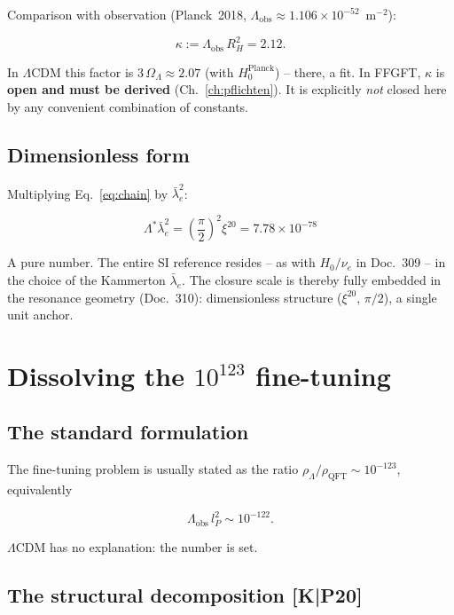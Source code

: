 Comparison with observation (Planck~2018,
$\Lambda_\text{obs} \approx 1.106\times10^{-52}$~m$^{-2}$):

\begin{equation}
  \kappa := \Lambda_\text{obs}\,R_H^{2} = 2.12.
  \label{eq:kappa}
\end{equation}

In $\Lambda$CDM this factor is $3\,\Omega_\Lambda \approx 2.07$
(with $H_0^\text{Planck}$) -- there, a fit. In FFGFT, $\kappa$ is
\textbf{open and must be derived} (Ch.~\ref{ch:pflichten}). It is explicitly
\emph{not} closed here by any convenient combination of constants.

\section{Dimensionless form}

Multiplying Eq.~\eqref{eq:chain} by $\bar\lambda_e^2$:

\begin{equation}
  \boxed{\;\Lambda^{*}\bar\lambda_e^{2}
  = \left(\frac{\pi}{2}\right)^{2}\xi^{20}
  = 7.78\times10^{-78}\;}
  \label{eq:dimless}
\end{equation}

A pure number. The entire SI reference resides -- as with $H_0/\nu_e$
in Doc.~309 -- in the choice of the Kammerton $\bar\lambda_e$. The
closure scale is thereby fully embedded in the resonance geometry
(Doc.~310): dimensionless structure ($\xi^{20}$, $\pi/2$), a single
unit anchor.

\chapter{Dissolving the $10^{123}$ fine-tuning}

\section{The standard formulation}

The fine-tuning problem is usually stated as the ratio
$\rho_\Lambda/\rho_\text{QFT} \sim 10^{-123}$, equivalently

\[
  \Lambda_\text{obs}\,l_P^{2} \sim 10^{-122}.
\]

$\Lambda$CDM has no explanation: the number is set.

\section{The structural decomposition [K|P20]}

